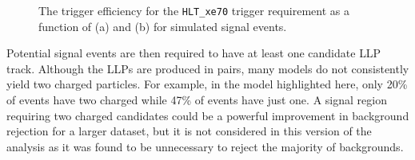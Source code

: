 \begin{figure}[h]
\centering
{}
\caption{The trigger efficiency for the \texttt{HLT\_xe70} trigger requirement as a function of (a) \met and (b) \calomet for simulated signal events.}
\label{fig:trigger_turnon}
\end{figure}

Potential signal events are then required to have at least one candidate \ac{LLP} track.
Although the \acp{LLP} are produced in pairs, many models do not consistently yield two charged particles.
For example, in the \rhadron model highlighted here, only 20\% of events have two charged \rhadrons while 47\% of events have just one.
A signal region requiring two charged candidates could be a powerful improvement in background rejection for a larger dataset, but it is not considered in this version of the analysis as it was found to be unnecessary to reject the majority of backgrounds.

